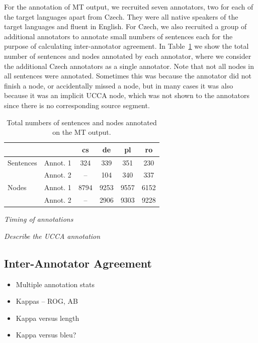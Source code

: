 \documentclass[11pt]{article}
\newcommand{\tabref}[1]{Table~\ref{#1}}
\begin{document}
For the annotation of MT output, we recruited seven annotators, two for each of the target languages apart from Czech. They were
all native speakers of the target languages and fluent in English. For Czech, we also recruited a  group of additional annotators
to annotate small numbers of sentences each for the purpose of calculating inter-annotator agreement. In \tabref{tab:annot}
we show the total number of sentences and nodes annotated by each annotator, where we consider the additional Czech
annotators as a single annotator. Note that not all nodes in all sentences were annotated. Sometimes this was because the
annotator did not finish a node, or accidentally missed a node, but in many cases it was also because it was an implicit 
UCCA node, which was not shown to the annotators since there is no corresponding source segment.
\begin{table}
\begin{center}
{\small
\begin{tabular}{ll|cccc}
& & cs & de & pl & ro \\
\hline
Sentences &  Annot. 1 & 324   & 339  & 351  & 230  \\
 & Annot. 2 & -- & 104  & 340  & 337 \\
\hline
Nodes & Annot. 1 & 8794  & 9253 & 9557  & 6152 \\
 &Annot. 2 & -- & 2906  & 9303  & 9228  \\
\end{tabular}
}
\caption{Total numbers of sentences and nodes annotated on the MT output.}
\label{tab:annot}
\end{center}
\end{table}

\emph{Timing of annotations}

\emph{Describe the UCCA annotation}





\subsection{Inter-Annotator Agreement}
\label{sec:iaa}
\begin{itemize}
  \item Multiple annotation stats
  \item Kappas -- ROG, AB
  \item Kappa versus length
  \item Kappa versus bleu?
\end{itemize}
\end{document}
